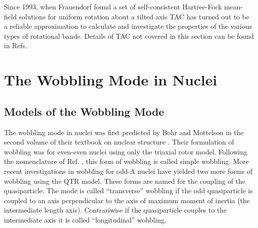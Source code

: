 Since 1993, when Frauendorf found a set of self-consistent Hartree-Fock mean-field solutions for uniform rotation about a tilted axis \cite{frauendorfTiltedCranking} TAC has turned out to be a reliable approximation to calculate and investigate the properties of the various types of rotational bands. Details of TAC not covered in this section can be found in Refs. \cite{frauendorfTiltedCranking,frauendorfChirality,frauendorfTACMultiQPBands,frauendorfTAC}

\section{The Wobbling Mode in Nuclei}
\label{sec:models-wobbling-mode}
\subsection{Models of the Wobbling Mode}
\label{ssec:models-wobbling-models}
The wobbling mode in nuclei was first predicted by Bohr and Mottelson in the second volume of their textbook on nuclear structure \cite{bohrMottelson2}. Their formulation of wobbling was for even-even nuclei using only the triaxial rotor model. Following the nomenclature of Ref. \cite{frauendorfTransverseWobbling}, this form of wobbling is called simple wobbling. More recent investigations \cite{frauendorfTransverseWobbling} in wobbling for odd-A nuclei have yielded two more forms of wobbling using the QTR model. These forms are named for the coupling of the quasiparticle. The mode is called ``transverse'' wobbling if the odd quasiparticle is coupled to an axis perpendicular to the axis of maximum moment of inertia (the intermediate length axis). Contrariwise if the quasiparticle couples to the intermediate axis it is called ``longitudinal'' wobbling.
